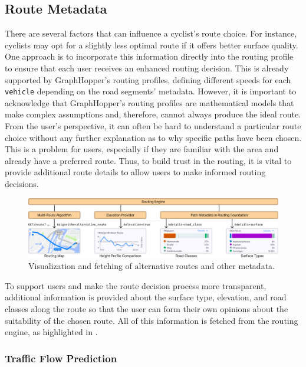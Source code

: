 \subsection{Route Metadata}

There are several factors that can influence a cyclist's route choice. For instance, cyclists may opt for a slightly less optimal route if it offers better surface quality. One approach is to incorporate this information directly into the routing profile to ensure that each user receives an enhanced routing decision. This is already supported by GraphHopper's routing profiles, defining different speeds for each \texttt{vehicle} depending on the road segments' metadata. However, it is important to acknowledge that GraphHopper's routing profiles are mathematical models that make complex assumptions and, therefore, cannot always produce the ideal route. From the user's perspective, it can often be hard to understand a particular route choice without any further explanation as to why specific paths have been chosen. This is a problem for users, especially if they are familiar with the area and already have a preferred route. Thus, to build trust in the routing, it is vital to provide additional route details to allow users to make informed routing decisions.

\begin{figure}[htbp]
\centering
\includegraphics[width=\linewidth]{images/graphhopper-data-flow.png}
\caption{Visualization and fetching of alternative routes and other metadata.}
\label{fig:graphhopper-data-flow}
\end{figure}

To support users and make the route decision process more transparent, additional information is provided about the surface type, elevation, and road classes along the route so that the user can form their own opinions about the suitability of the chosen route. All of this information is fetched from the routing engine, as highlighted in .

\subsubsection{Traffic Flow Prediction}

